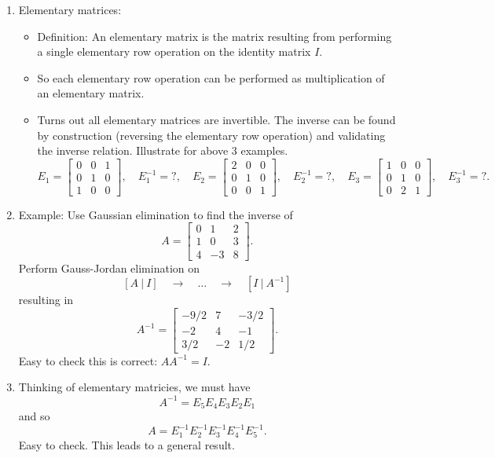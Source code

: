 \documentclass{article}
\begin{document}
\begin{enumerate}
\begin{enumerate}
\item Elementary matrices:
\begin{itemize}
\item Definition: An elementary matrix is the matrix resulting from performing a single elementary row operation on the identity matrix $I$.

\item So each elementary row operation can be performed as multiplication of an elementary matrix.

\item Turns out all elementary matrices are invertible. The inverse can be found by construction (reversing the elementary row operation) and validating the inverse relation. Illustrate for above 3 examples.
\[
E_1 = \left[
\begin{array}{ccc}
0 & 0 & 1 \\
0 & 1 & 0 \\
1 & 0 & 0  
\end{array}
\right], \quad E_1^{-1} = ?, \quad
E_2 = \left[
\begin{array}{ccc}
2 & 0 & 0 \\
0 & 1 & 0 \\
0 & 0 & 1
\end{array}
\right], \quad E_2^{-1} = ?, \quad
E_3 = \left[
\begin{array}{ccc}
1 & 0 & 0 \\
0 & 1 & 0 \\
0 & 2 & 1
\end{array}
\right], \quad E_3^{-1} = ?.
\]
\end{itemize}

\item Example: Use Gaussian elimination to find the inverse of 
\[
A= \left[
\begin{array}{ccc}
0 & 1 & 2 \\
1 & 0 & 3 \\
4 & -3 & 8
\end{array}
\right].
\]
Perform Gauss-Jordan elimination on 
\[
[A ~ | ~ I] \quad \rightarrow \quad \dots \quad \rightarrow \quad [I ~ | ~ A^{-1}]
\]
resulting in 
\[
A^{-1} = \left[ \begin{array}{ccc}
-9/2 & 7 & -3/2 \\
-2 & 4 & -1 \\
3/2 & -2 & 1/2
\end{array} \right].
\]
Easy to check this is correct: $A A^{-1}=I$.

\item Thinking of elementary matricies, we must have
\[
A^{-1} = E_5 E_4 E_3 E_2 E_1
\]
and so
\[
A = E_1^{-1}E_2^{-1}E_3^{-1}E_4^{-1}E_5^{-1}.
\] 
Easy to check. This leads to a general result.


\end{enumerate}
\end{enumerate}
\end{document}
